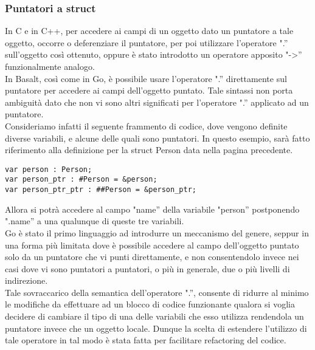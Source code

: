\subsubsection{Puntatori a struct}
In C e in C++, per accedere ai campi di un oggetto dato un puntatore a tale oggetto, occorre o deferenziare il 
puntatore, per poi utilizzare l’operatore ".” sull’oggetto così ottenuto, oppure è stato introdotto un operatore 
apposito "->” funzionalmente analogo. \\ 

In Basalt, così come in Go, è possibile usare l’operatore ".” direttamente sul puntatore per accedere ai campi 
dell’oggetto puntato. Tale sintassi non porta ambiguità dato che non vi sono altri 
significati per l’operatore ".” applicato ad un puntatore. \\

Consideriamo infatti il seguente frammento di codice, dove vengono definite diverse variabili, e alcune delle 
quali sono puntatori. In questo esempio, sarà fatto riferimento alla 
definizione per la struct Person data nella pagina precedente. \\

\vspace{0.5cm}
\begin{lstlisting}[frame=single]
var person : Person;
var person_ptr : #Person = &person;
var person_ptr_ptr : ##Person = &person_ptr;
\end{lstlisting}
\vspace{0.5cm}
 
Allora si potrà accedere al campo "name” della variabile "person” postponendo 
".name” a una qualunque di queste tre variabili. \\ 

Go è stato il primo linguaggio ad introdurre un meccanismo del genere, seppur in una forma 
più limitata dove è possibile accedere al campo dell’oggetto puntato solo da un 
puntatore che vi punti direttamente, e non consentendolo invece nei casi dove vi 
sono puntatori a puntatori, o più in generale, due o più livelli di indirezione. \\ 

Tale sovraccarico della semantica dell’operatore ".”, consente di ridurre al minimo le 
modifiche da effettuare ad un blocco di codice funzionante qualora si voglia decidere 
di cambiare il tipo di una delle variabili che esso utilizza rendendola un puntatore 
invece che un oggetto locale. Dunque la scelta di estendere l’utilizzo di tale 
operatore in tal modo è stata fatta per facilitare refactoring del codice. \\ 

